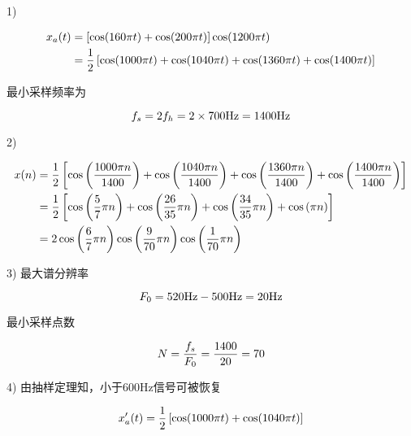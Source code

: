 \documentclass[cn, hazy, blue, normal, 14pt]{elegantnote}
\begin{document}
\begin{solution}[print=true]
    
1)

\begin{equation}
\notag
\begin{aligned}
    x_a(t)&=\left[\cos(160\pi t)+\cos(200\pi t)\right]\cos(1200\pi t) \\
    &=\frac{1}{2}\left[\cos(1000\pi t)+\cos(1040\pi t)+\cos(1360\pi t)+\cos(1400\pi t)\right]
\end{aligned}
\end{equation}

最小采样频率为

\begin{equation}
\notag
    f_s=2f_h=2\times 700\text{Hz}=1400\text{Hz}
\end{equation}

2)

\begin{equation}
\notag
\begin{aligned}
    x(n)&=\frac{1}{2}\left[\cos\left(\frac{1000\pi n}{1400}\right)+\cos\left(\frac{1040\pi n}{1400}\right)+\cos\left(\frac{1360\pi n}{1400}\right)+\cos\left(\frac{1400\pi n}{1400}\right)\right] \\
    &=\frac{1}{2}\left[\cos\left(\frac{5}{7}\pi n\right)+\cos\left(\frac{26}{35}\pi n\right)+\cos\left(\frac{34}{35}\pi n\right)+\cos\left(\pi n\right)\right] \\
    &=2\cos\left(\frac{6}{7}\pi n\right)\cos\left(\frac{9}{70}\pi n\right)\cos\left(\frac{1}{70}\pi n\right)
\end{aligned}
\end{equation}

3) 最大谱分辨率

\begin{equation}
\notag
    F_0=520\text{Hz}-500\text{Hz}=20\text{Hz}
\end{equation}

最小采样点数

\begin{equation}
\notag
    N=\frac{f_s}{F_0}=\frac{1400}{20}=70
\end{equation}

4) 由抽样定理知，小于600Hz信号可被恢复

\begin{equation}
\notag
    x'_a(t)=\frac{1}{2}\left[\cos(1000\pi t)+\cos(1040\pi t)\right]
\end{equation}

\end{solution}
\end{document}
